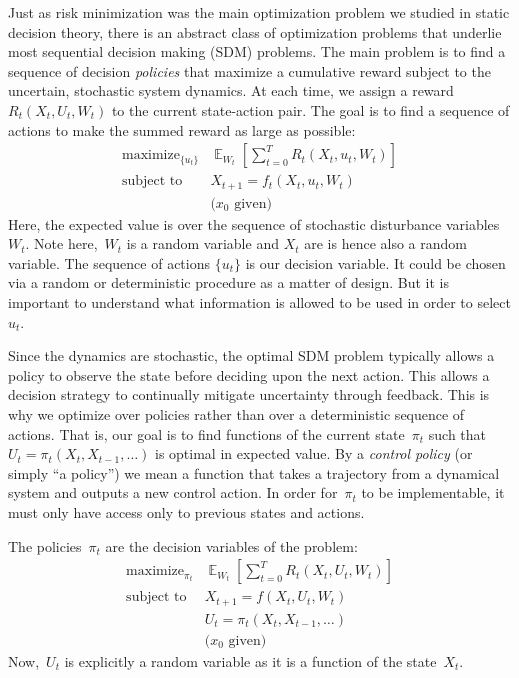 \documentclass{tufte-book}
\begin{document}
Just as risk minimization was the main optimization problem we studied
in static decision theory, there is an abstract class of optimization
problems that underlie most sequential decision making (SDM) problems.
The main problem is to find a sequence of decision \emph{policies} that
maximize a cumulative reward subject to the uncertain, stochastic system
dynamics. At each time, we assign a reward~\(R_t(X_t,U_t,W_t)\) to the
current state-action pair. The goal is to find a sequence of actions to
make the summed reward as large as possible: \[
\begin{array}{ll}
\text{maximize}_{\{u_t\}} & \mathop\mathbb{E}_{W_t}\left[ \sum_{t=0}^T R_t(X_t,u_t,W_t) \right]\\
\text{subject to} & X_{t+1} = f_t(X_t, u_t, W_t)\\
& \text{($x_0$ given)}
\end{array}
\] Here, the expected value is over the sequence of stochastic
disturbance variables~\(W_t\). Note here,~\(W_t\) is a random variable
and \(X_t\) are is hence also a random variable. The sequence of actions
\(\{u_t\}\) is our decision variable. It could be chosen via a random or
deterministic procedure as a matter of design. But it is important to
understand what information is allowed to be used in order to select
\(u_t\).

Since the dynamics are stochastic, the optimal SDM problem typically
allows a policy to observe the state before deciding upon the next
action. This allows a decision strategy to continually mitigate
uncertainty through feedback. This is why we optimize over policies
rather than over a deterministic sequence of actions. That is, our goal
is to find functions of the current state~\(\pi_t\) such that
\(U_t=\pi_t(X_t, X_{t-1}, \ldots)\) is optimal in expected value. By a
\emph{control policy} (or simply ``a policy'') we mean a function that
takes a trajectory from a dynamical system and outputs a new control
action. In order for~\(\pi_t\) to be implementable, it must only have
access only to previous states and actions.

The policies~\(\pi_t\) are the decision variables of the problem: \[
\begin{array}{ll}
\text{maximize}_{\pi_t} & \mathop\mathbb{E}_{W_t}\left[ \sum_{t=0}^T R_t(X_t,U_t,W_t) \right]\\
\text{subject to} & X_{t+1} = f(X_t, U_t, W_t) \\
& U_t = \pi_t(X_t, X_{t-1},\ldots)\\
& \text{($x_0$ given)}
\end{array}
\] Now,~\(U_t\) is explicitly a random variable as it is a function of
the state~\(X_t\).
\end{document}
